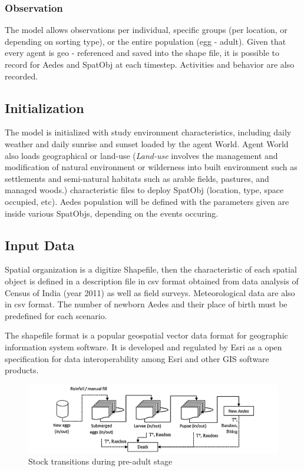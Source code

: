 \subsubsection{Observation}
The model allows observations per individual, specific groups (per location, or depending on sorting type), or the entire population (egg - adult). Given that every agent is geo - referenced and saved into the shape file, it is possible to record for Aedes and SpatObj at each timestep. Activities and behavior are also recorded.

\subsection{Initialization}

The model is initialized with study environment characteristics, including daily weather and daily sunrise and sunset loaded by the agent World. Agent World also loads geographical or land-use (\textit{Land-use} involves the management and modification of natural environment or wilderness into built environment such as settlements and semi-natural habitats such as arable fields, pastures, and managed woods.) characteristic files to deploy SpatObj (location, type, space occupied, etc). Aedes population will be defined with the parameters given are inside various SpatObjs, depending on the events occuring.

\subsection{Input Data}

    Spatial organization is a digitize Shapefile, then the characteristic of each spatial object is defined in a description file in csv format obtained from data analysis of Census of India (year 2011) as well as field surveys. Meteorological data are also in csv format. The number of newborn Aedes and their place of birth must be predefined for each scenario.
		
	The shapefile format is a popular geospatial vector data format for geographic information system software. It is developed and regulated by Esri as a open specification for data interoperability among Esri and other GIS software products.
\begin{figure}
     \centering \includegraphics[width = 17cm]{fig2.png}
        \caption{Stock transitions during pre-adult stage}
\end{figure}
